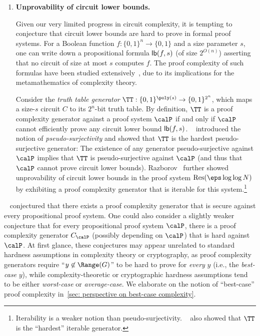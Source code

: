 \begin{enumerate}
    \item {\bf Unprovability of circuit lower bounds.}
    
    Given our very limited progress in circuit complexity, it is tempting to conjecture that circuit lower bounds are hard to prove in formal proof systems. For a Boolean function $f: \{0, 1\}^n \to \{0, 1\}$ and a size parameter $s$, one can write down a propositional formula ${\sf lb}(f, s)$ (of size $2^{O(n)}$) asserting that no circuit of size at most $s$ computes $f$. The proof complexity of such formulas have been studied extensively~\cite{Razborov98, Razborov04, Krajicek04, razborov2015pseudorandom, Pich15, PichS19, SanthanamT21, PichS22}, due to its implications for the metamathematics of complexity theory.

    Consider the \emph{truth table generator} $\TT: \{0,1\}^{\poly(s)} \to \{0,1\}^{2^n}$, which maps a size-$s$ circuit $C$ to its $2^n$-bit truth table. By definition, $\TT$ is a proof complexity generator against a proof system $\calP$ if and only if $\calP$ cannot efficiently prove any circuit lower bound ${\sf lb}(f, s)$. \Krajicek~\cite{Krajicek04} introduced the notion of \emph{pseudo-surjectivity} and showed that $\TT$ is the hardest pseudo-surjective generator: The existence of any generator pseudo-surjective against $\calP$ implies that $\TT$ is pseudo-surjective against $\calP$ (and thus that $\calP$ cannot prove circuit lower bounds). Razborov~\cite{razborov2015pseudorandom} further showed unprovability of circuit lower bounds in the proof system ${\rm Res}(\eps \log\log N)$ by exhibiting a proof complexity generator that is iterable for this system.\footnote{Iterability is a weaker notion than pseudo-surjectivity. \Krajicek~\cite{Krajicek04} also showed that $\TT$ is the ``hardest'' iterable generator.}
\end{enumerate}

\Krajicek~\cite{Krajicek04, Krajicek23, krajivcek2024existence} conjectured that there exists a proof complexity generator that is secure against every propositional proof system. One could also consider a slightly weaker conjecture that for every propositional proof system $\calP$, there is a proof complexity generator $C_\calP$ (possibly depending on $\calP$) that is hard against $\calP$. At first glance, these conjectures may appear unrelated to standard hardness assumptions in complexity theory or cryptography, as proof complexity generators require ``$y\not\in\Range(G)$'' to be hard to prove for \emph{every} $y$ (i.e., the \emph{best-case} $y$), while complexity-theoretic or cryptographic hardness assumptions tend to be either \emph{worst-case} or \emph{average-case}. We elaborate on the notion of ``best-case'' proof complexity in~\autoref{sec: perspective on best-case complexity}.

